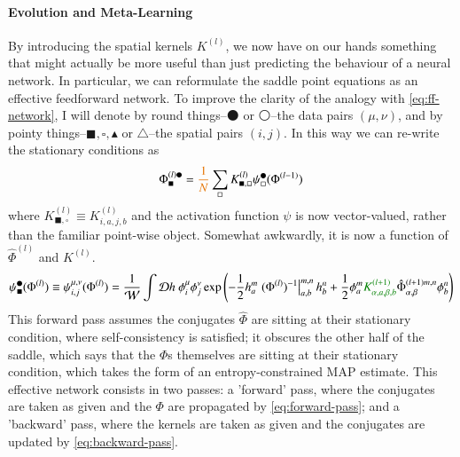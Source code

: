\documentclass[../main.tex]{subfiles}
\begin{document}
\paragraph{Evolution and Meta-Learning}

By introducing the spatial kernels $K^{(l)}$, we now have on our hands something that might actually be more useful than just predicting the behaviour of a neural network. In particular, we can reformulate the saddle point equations as an effective feedforward network. To improve the clarity of the analogy with \eqref{eq:ff-network}, I will denote by round things--$\medbullet$ or $\medcirc$--the data pairs $(\mu,\nu)$, and by pointy things--$\blacksquare, \square, \blacktriangle$ or $\triangle$--the spatial pairs $(i,j)$. In this way we can re-write the stationary conditions as
\begin{align}
  \Phi^{(l)\medbullet}_{\blacksquare} = \fix{\frac1N} \sum_{\square} K_{\blacksquare, \square}^{(l)} \psi^{\medbullet}_{\square}( \Phi^{(l-1)} )
  \label{eq:forward-pass}
\end{align}
where $K^{(l)}_{\blacksquare, \square} \equiv K^{(l)}_{i,a,j,b}$ and the activation function $\psi$ is now vector-valued, rather than the familiar point-wise object. Somewhat awkwardly, it is now a function of $\hat \Phi^{(l)}$ and $K^{(l)}$.
\begin{align*}
  \psi^{\medbullet}_{\blacksquare}(\Phi^{(l)}) 
  \equiv \psi^{\mu,\nu}_{i,j} (\Phi^{(l)}) = 
    \frac{1}{\mathcal W} \int \mathcal D h \
      \phi^{\mu}_i \phi^{\nu}_j \exp \left(
        - \frac12 h^{m}_a \left. (\Phi^{(l)})^{-1} \right|^{m,n}_{a,b} h^{n}_b 
        + \frac12 \phi^{m}_a \typo{K^{(l+1)}_{\alpha,a,\beta,b}} \hat \Phi^{(l+1)m,n}_{\alpha,\beta} \phi^{n}_{b}
      \right)
\end{align*}
This forward pass assumes the conjugates $\hat \Phi$ are sitting at their stationary condition, where self-consistency is satisfied; it obscures the other half of the saddle, which says that the $\Phi$s themselves are sitting at their stationary condition, which takes the form of an entropy-constrained MAP estimate. This effective network consists in two passes: a 'forward' pass, where the conjugates are taken as given and the $\Phi$ are propagated by \eqref{eq:forward-pass}; and a 'backward' pass, where the kernels are taken as given and the conjugates are updated by \eqref{eq:backward-pass}. 
\end{document}
